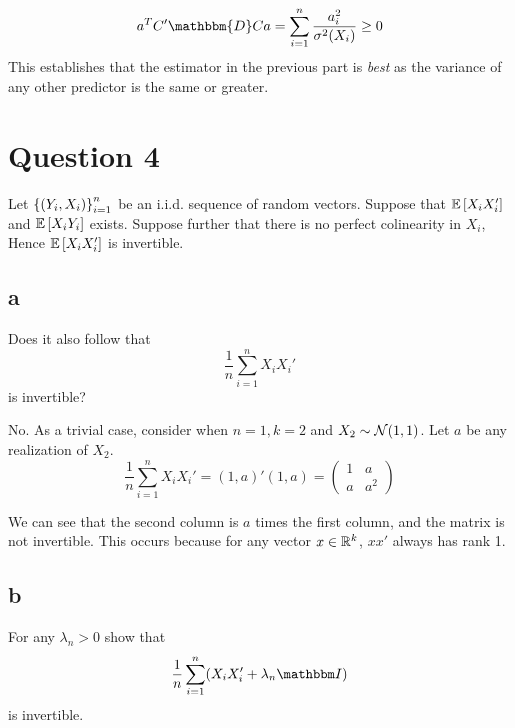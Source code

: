 \documentclass[12pt]{paper}
\begin{document}
$$a^T C' \mathbbm{D} C a = \sum_{i=1}^n \frac{a_i^2}{\sigma^2(X_i)} \geq 0$$
This establishes that the estimator in the previous part is \textit{best} as the variance of any other predictor is the same or greater.

\section*{Question 4}


Let ${\left \{ (Y_i,X_i) \right \}}_{i=1}^n$ be an i.i.d. sequence of random
vectors. Suppose that $\mathbb{E} \left [ X_i X_i' \right ]$ and $\mathbb{E} \left [ X_i Y_i \right ]$
exists. Suppose further that there is no perfect colinearity in
$X_i$, Hence $\mathbb{E} \left [ X_i X_i' \right ]$ is invertible.

\subsection*{a}

Does it also follow that
\begin{equation*}
  \frac{1}{n} \sum_{i=1}^n X_i X_i'
\end{equation*} 
is invertible? \newline \newline

No. As a trivial case, consider when $n=1, k=2$ and $X_2 \sim \mathcal{N}( 1, 1
)$. Let $a$ be any realization of $X_2$.
\begin{equation*}
  \frac{1}{n} \sum_{i=1}^n X_i X_i' = (1,a)' (1,a) =
  \begin{pmatrix}
    1 & a\\ a & a^2
  \end{pmatrix}
\end{equation*}

We can see that the second column is $a$ times the first column, and
the matrix is not invertible. This occurs because for any vector $x \in
\mathbb{R}^k$, $x x'$ always has rank 1.

\subsection*{b}

For any $\lambda_n > 0$ show that
\begin{equation*}
  \frac{1}{n} \sum_{i=1}^n ( X_i X_i' + \lambda_n \eye )
\end{equation*}
is invertible. \newline \newline
\end{document}
